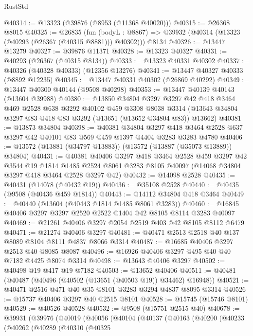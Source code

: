 \begin{lexlean}{RustStd}
\begin{coremodule}
@40314 := @13323 (@39876 (@8953 (@11368 @40020)))
@40315 := @26368 @8015
@40325 := @26835
    (fun (bodyL : @8867) => @39932 (@40314 (@13323 (@40293 (@26367 (@40315 @8881))) @40302)))
    @8134
@40326 := @13447 @13279
@40327 := @39876 @11371
@40328 := @13323 @40327
@40331 := @40293 (@26367 (@40315 @8134))
@40333 := @13323 @40331 @40302
@40337 := @40326 (@40328 @40333) (@12356 @13276)
@40341 := @13447 @40327 @40333 (@8892 @12235)
@40345 := @13447 @40331 @40302 (@26869 @40292)
@40349 := @13447 @40300 @40144 (@9508 @40298)
@40353 := @13447 @40139 @40143 (@13604 @39988)
@40380 := @13850
    @34804
    @3297
    @3297
    @42
    @418
    @3464
    @469
    @2528
    @638
    @3292
    @40102
    @459
    @3308
    @8038
    @3314
    (@13643 @34804 @3297 @83 @418 @83 @3292 (@13651 (@13652 @34804 @83)) @13662)
@40381 := @13873 @34804
@40398 := @40381
    @34804
    @3297
    @418
    @3464
    @2528
    @637
    @3297
    @42
    @40101
    @83
    @569
    @459
    @1397
    @4404
    @3283
    @3283
    @4780
@40406 := @13572 (@13881 (@34797 @13883)) (@13572 (@13887 (@35073 @13889)) @34804)
@40431 := @40381
    @40406
    @3297
    @418
    @3464
    @2528
    @459
    @3297
    @42
    @3544
    @19
    @1814
    @1485
    @2524
    @8061
    @3283
    @8105
    @40097
    (@14068 @34804 @3297 @418 @3464 @2528 @3297 @42)
@40432 := @14098 @2528
@40435 := @40431 (@14078 (@40432 @19))
@40436 := @35108 @2528
@40440 := @40435 (@9508 (@40436 @459 @1814))
@40443 := @14112 @34804 @418 @3464
@40449 := @40440 (@13604 (@40443 @1814 @1485 @8061 @3283))
@40460 := @16845 @40406 @3297 @3297 @2520 @2522 @1404 @42 @8105 @8114 @3283 @40097
@40469 := @21261 @40406 @3297 @2054 @2519 @403 @42 @8105 @8112 @6479
@40471 := @21274 @40406 @3297
@40481 := @40471 @2513 @2518 @40 @137 @8089 @8104 @8111 @4837 @8066 @3314
@40487 := @16685 @40406 @3297 @2513 @40 @8085 @8087
@40496 := @16926 @40406 @3297 @495 @40 @40 @7182 @4425 @8074 @3314
@40498 := @13643 @40406 @3297
@40502 := @40498 @19 @417 @19 @7182
@40503 := @13652 @40406
@40511 := @40481 (@40487 (@40496 (@40502 (@13651 (@40503 @19)) @34462) @16948))
@40521 := @40471 @2516 @471 @40 @35 @8101 @3283 @3294 @4837 @8095 @3314
@40526 := @15737 @40406 @3297 @40 @2515 @8101
@40528 := @15745 (@15746 @8101)
@40529 := @40526 @40528
@40532 := @9508 (@15751 @2515 @40)
@40678 := @39931
    (@39976
      (@40019
        (@40056
          (@40104
            (@40137
              (@40163
                (@40200
                  (@40233
                    (@40262
                      (@40289
                        (@40310
                          (@40325

\end{coremodule}
\end{lexlean}
